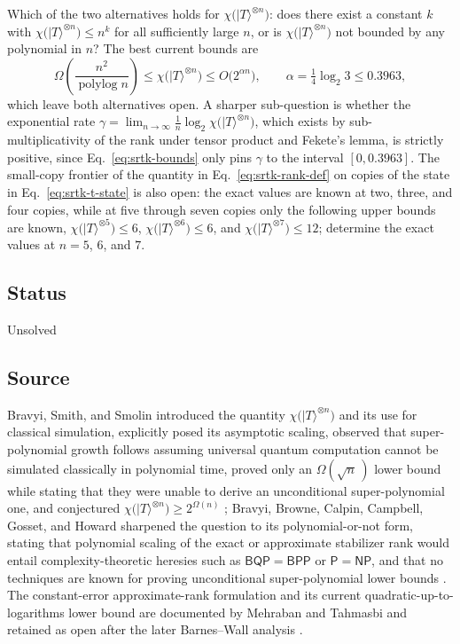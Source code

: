 Which of the two alternatives holds for
$\chi\bigl(|T\rangle^{\otimes n}\bigr)$: does there exist a constant $k$
with $\chi\bigl(|T\rangle^{\otimes n}\bigr) \le n^{k}$ for all sufficiently large $n$, or is
$\chi\bigl(|T\rangle^{\otimes n}\bigr)$ not bounded by any polynomial in
$n$?  The best current bounds are
\begin{equation}
  \Omega\!\left(\frac{n^{2}}{\operatorname{polylog} n}\right) \le
  \chi\bigl(|T\rangle^{\otimes n}\bigr) \le O\bigl(2^{\alpha n}\bigr),
  \qquad \alpha = \tfrac{1}{4}\log_{2} 3 \le 0.3963,
  \label{eq:srtk-bounds}
\end{equation}
which leave both alternatives open.  A sharper sub-question is whether the
exponential rate $\gamma = \lim_{n\to\infty} \frac{1}{n}\log_{2}
\chi\bigl(|T\rangle^{\otimes n}\bigr)$, which exists by sub-multiplicativity
of the rank under tensor product and Fekete's lemma, is strictly positive,
since Eq.~\eqref{eq:srtk-bounds} only pins $\gamma$ to the interval
$[0, 0.3963]$.  The small-copy frontier of the quantity in
Eq.~\eqref{eq:srtk-rank-def} on copies of the state in
Eq.~\eqref{eq:srtk-t-state} is also open: the exact values are known at two, three, and four copies, while at five
through seven copies only the following upper bounds are known,
$\chi\bigl(|T\rangle^{\otimes 5}\bigr) \le 6$,
$\chi\bigl(|T\rangle^{\otimes 6}\bigr) \le 6$, and
$\chi\bigl(|T\rangle^{\otimes 7}\bigr) \le 12$; determine the exact values
at $n = 5$, $6$, and $7$.

\subsection*{Status}

Unsolved

\subsection*{Source}

Bravyi, Smith, and Smolin introduced the quantity
$\chi\bigl(|T\rangle^{\otimes n}\bigr)$ and its use for classical
simulation, explicitly posed its asymptotic scaling, observed that
super-polynomial growth follows assuming universal quantum computation
cannot be simulated classically in polynomial time, proved only an
$\Omega(\sqrt{n}\,)$ lower bound while stating that they were unable to
derive an unconditional super-polynomial one, and conjectured
$\chi\bigl(|T\rangle^{\otimes n}\bigr) \ge 2^{\Omega(n)}$
; Bravyi, Browne, Calpin, Campbell,
Gosset, and Howard sharpened the question to its polynomial-or-not form,
stating that polynomial scaling of the exact or approximate stabilizer
rank would entail complexity-theoretic heresies such as
$\mathsf{BQP} = \mathsf{BPP}$ or $\mathsf{P} = \mathsf{NP}$, and that no
techniques are known for proving unconditional super-polynomial lower
bounds .  The constant-error approximate-rank formulation and its current quadratic-up-to-logarithms lower bound are documented by Mehraban and Tahmasbi and retained as open after the later Barnes--Wall analysis .


